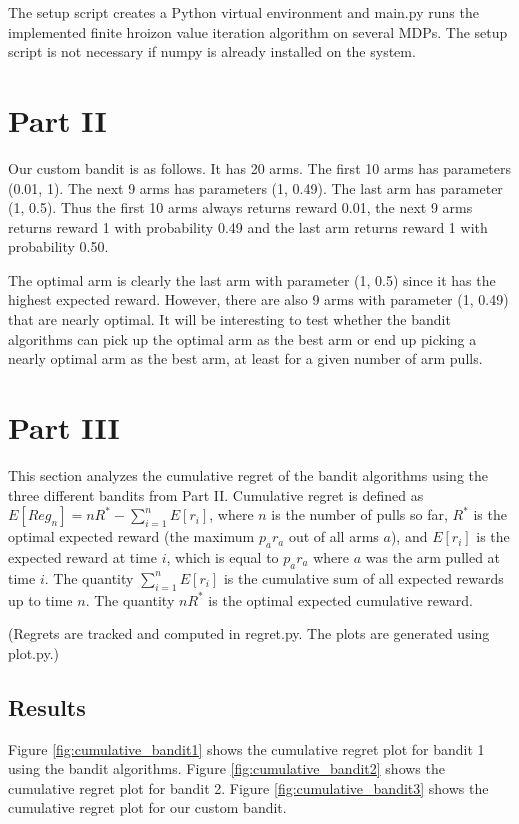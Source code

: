 \documentclass[paper=a4, fontsize=11pt]{scrartcl}
\begin{document}
The setup script creates a Python virtual environment and main.py runs the implemented finite hroizon value iteration algorithm on several MDPs. The setup script is not necessary if numpy is already installed on the system.

\section{Part II}

Our custom bandit is as follows. It has 20 arms. The first 10 arms has parameters (0.01, 1). The next 9 arms has parameters (1, 0.49). The last arm has parameter (1, 0.5). Thus the first 10 arms always returns reward 0.01, the next 9 arms returns reward 1 with probability 0.49 and the last arm returns reward 1 with probability 0.50.

The optimal arm is clearly the last arm with parameter (1, 0.5) since it has the highest expected reward. However, there are also 9 arms with parameter (1, 0.49) that are nearly optimal. It will be interesting to test whether the bandit algorithms can pick up the optimal arm as the best arm or end up picking a nearly optimal arm as the best arm, at least for a given number of arm pulls.

\section{Part III}

This section analyzes the cumulative regret of the bandit algorithms using the three different bandits from Part II. Cumulative regret is defined as $E[Reg_n] = nR^{*} - \sum_{i=1}^n E[r_i]$, where $n$ is the number of pulls so far, $R^{*}$ is the optimal expected reward (the maximum $p_a r_a$ out of all arms $a$), and $E[r_i]$ is the expected reward at time $i$, which is equal to $p_a r_a$ where $a$ was the arm pulled at time $i$. The quantity $\sum_{i=1}^n E[r_i]$ is the cumulative sum of all expected rewards up to time $n$. The quantity $nR^{*}$ is the optimal expected cumulative reward.

(Regrets are tracked and computed in regret.py. The plots are generated using plot.py.)

\subsection{Results}

Figure \ref{fig:cumulative_bandit1} shows the cumulative regret plot for bandit 1 using the bandit algorithms. Figure \ref{fig:cumulative_bandit2} shows the cumulative regret plot for bandit 2. Figure \ref{fig:cumulative_bandit3} shows the cumulative regret plot for our custom bandit.
\end{document}
